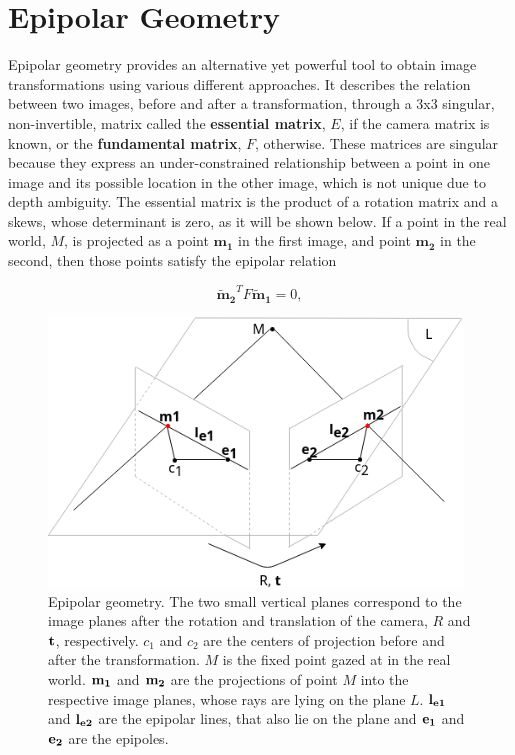 
\section{Epipolar Geometry}
\label{cha2:epipolar}

Epipolar geometry provides an alternative yet powerful tool to obtain image transformations using various different approaches. It describes the relation between two images, before and after a transformation, through a 3x3 singular, non-invertible, matrix called the \textbf{essential matrix}, \textbf{$E$}, if the camera matrix is known, or the \textbf{fundamental matrix}, \textbf{$F$}, otherwise. These matrices are singular because they express an under-constrained relationship between a point in one image and its possible location in the other image, which is not unique due to depth ambiguity. The essential matrix is the product of a rotation matrix and a \gls{skews}, whose determinant is zero, as it will be shown below. If a point in the real world, $M$, is projected as a point $\mathbf{{m}_1}$ in the first image, and point $\mathbf{{m}_2}$ in the second, then those points satisfy the epipolar relation

\begin{equation}
\label{sec2:eq:epipolar}
\mathbf{\tilde{m}_2}^T F \mathbf{\tilde{m}_1} = 0,
\end{equation}

\begin{figure}[h]
	\centering
	\includegraphics[width=11cm]{images/epipolargeo.png}
	\caption[Epipolar geometry]{Epipolar geometry. The two small vertical planes correspond to the image planes after the rotation and translation of the camera, $R$ and $\bf t$, respectively. $c_1$ and $c_2$ are the centers of projection before and after the transformation. $M$ is the fixed point gazed at in the real world. $\bf m_1$ and $\bf m_2$ are the projections of point $M$ into the respective image planes, whose rays are lying on the plane $L$. $\bf l_{e1}$ and $\bf l_{e2}$ are the epipolar lines, that also lie on the plane and $\bf e_1$ and $\bf e_2$ are the epipoles.}
	\label{sec2:fig:epipolargeo}
\end{figure}

